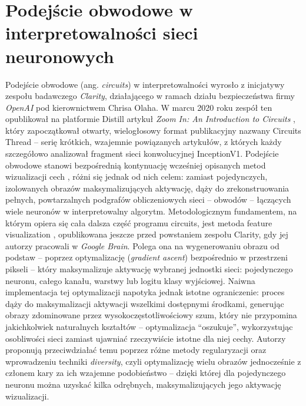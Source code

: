 \section{Podejście obwodowe w interpretowalności sieci neuronowych}
\label{sec:podejscie_obwodowe}
Podejście obwodowe (ang. \textit{circuits}) w interpretowalności wyrosło z inicjatywy zespołu badawczego \textit{Clarity}, działającego w ramach działu bezpieczeństwa firmy \textit{OpenAI} pod kierownictwem Chrisa Olaha. W marcu 2020 roku zespół ten opublikował na platformie Distill artykuł \textit{Zoom In: An Introduction to Circuits} \cite{olah_2020_zoom_in_circuits}, który zapoczątkował otwarty, wielogłosowy format publikacyjny nazwany Circuits Thread \cite{cammarata_2020_thread_circuits} -- serię krótkich, wzajemnie powiązanych artykułów, z których każdy szczegółowo analizował fragment sieci konwolucyjnej InceptionV1. Podejście obwodowe stanowi bezpośrednią kontynuację wcześniej opisanych metod wizualizacji cech \cite{erhan_visualizing_higher_layer_features} \cite{zeiler_visualizing_and_understanding}, różni się jednak od nich celem: zamiast pojedynczych, izolowanych obrazów maksymalizujących aktywację, dąży do zrekonstruowania pełnych, powtarzalnych podgrafów obliczeniowych sieci -- obwodów -- łączących wiele neuronów w interpretowalny algorytm. \newline
Metodologicznym fundamentem, na którym opiera się cała dalsza część programu circuits, jest metoda feature visualization \cite{olah_2017_feature_visualization}, opublikowana jeszcze przed powstaniem zespołu Clarity, gdy jej autorzy pracowali w \textit{Google Brain}. Polega ona na wygenerowaniu obrazu od podstaw -- poprzez optymalizację (\textit{gradient ascent}) bezpośrednio w przestrzeni pikseli -- który maksymalizuje aktywację wybranej jednostki sieci: pojedynczego neuronu, całego kanału, warstwy lub logitu klasy wyjściowej. Naiwna implementacja tej optymalizacji napotyka jednak istotne ograniczenie: proces dąży do maksymalizacji aktywacji wszelkimi dostępnymi środkami, generując obrazy zdominowane przez wysokoczęstotliwościowy szum, który nie przypomina jakichkolwiek naturalnych kształtów -- optymalizacja \enquote{oszukuje}, wykorzystując osobliwości sieci zamiast ujawniać rzeczywiście istotne dla niej cechy. Autorzy proponują przeciwdziałać temu poprzez różne metody regularyzacji oraz wprowadzeniu techniki \textit{diversity}, czyli optymalizację wielu obrazów jednocześnie z członem kary za ich wzajemne podobieństwo -- dzięki której dla pojedynczego neuronu można uzyskać kilka odrębnych, maksymalizujących jego aktywację wizualizacji. \newline
